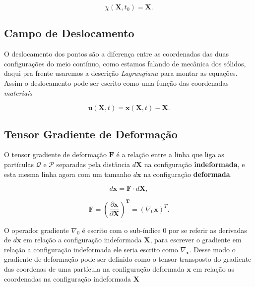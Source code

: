 \begin{equation}
	\chi(\mathbf{X}, t_0) = \mathbf{X}.
\end{equation}


\subsection{Campo de Deslocamento}
O deslocamento dos pontos são a diferença entre as coordenadas das duas configurações do meio contínuo, como estamos falando de mecânica dos sólidos, daqui pra frente usaremos a descrição \textit{Lagrangiana} para montar as equações. Assim o deslocamento pode ser escrito como uma função das coordenadas \textit{materiais}

\begin{equation}
	\mathbf{u}(\mathbf{X}, t) = \mathbf{x}(\mathbf{X}, t) - \mathbf{X}.
	\label{dispX}
\end{equation}


\subsection{Tensor Gradiente de Deformação}
O tensor gradiente de deformação $\mathbf{F}$ é a relação entre a linha que liga as partículas $\mathcal{Q}$  e $\mathcal{P}$ separadas pela distância $d\mathbf{X}$ na configuração \textbf{indeformada}, e esta mesma linha agora com um tamanho $d\mathbf{x}$ na configuração \textbf{deformada}.  

\begin{equation}
	d\mathbf{x} = \mathbf{F} \cdot d\mathbf{X},
	\label{eq:dx_FdX}
\end{equation}

\begin{equation}
	\mathbf{F} = (\frac{\partial\mathbf{x}}{\partial\mathbf{X}})^\mathbf{T} = (\nabla_{0}\mathbf{x})^T.
	\label{Fdef}
\end{equation}

O operador gradiente $\nabla_{0}$ é escrito com o sub-índice 0 por se referir as derivadas de $d\mathbf{x}$ em relação a configuração indeformada $\mathbf{X}$, para escrever o gradiente em relação a configuração indeformada ele seria escrito como $\nabla_{\mathbf{x}}$. Desse modo o gradiente de deformação pode ser definido como o tensor transposto do gradiente das coordenas de uma partícula na configuração deformada $\mathbf{x}$ em relação as coordenadas na configuração indeformada $\mathbf{X}$

